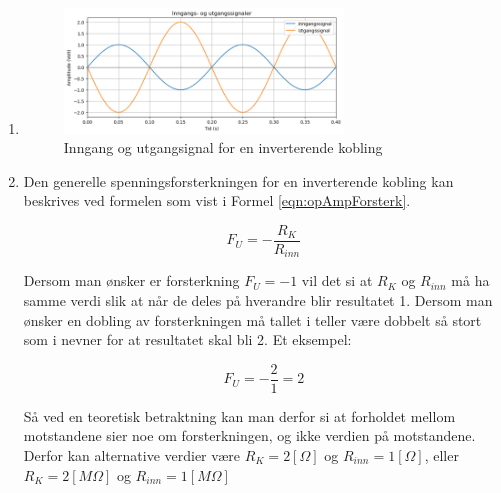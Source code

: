 \vspace{0.5cm} %

\begin{solution}[name=Løsningsforslag oppgave]
		\begin{enumerate}[label=\roman*)]
	\item
		\begin{figure}[H]
		\centering
		\includegraphics[width=0.7\textwidth]{operasjonsforsterker/plot/InvPlotSOL.png}
		\caption{Inngang og utgangsignal for en inverterende kobling}
		\label{fig:invPlotSOL}
	\end{figure}
	\item Den generelle spenningsforsterkningen for en inverterende kobling kan beskrives ved formelen som vist i Formel \ref{eqn:opAmpForsterk}.

	\begin{equation}
		\label{eqn:opAmpForsterk}
		F_U = -\frac{R_K}{R_{inn}}
	\end{equation}

Dersom man ønsker er forsterkning $F_U=-1$ vil det si at $R_K$ og $R_{inn}$ må ha samme verdi slik at når de deles på hverandre blir resultatet 1. Dersom man ønsker en dobling av forsterkningen må tallet i teller være dobbelt så stort som i nevner for at resultatet skal bli 2. Et eksempel:

\[F_U=-\frac{2}{1}=2\]

Så ved en teoretisk betraktning kan man derfor si at forholdet mellom motstandene sier noe om forsterkningen, og ikke verdien på motstandene. Derfor kan alternative verdier være $R_K=2 [\Omega]$ og $R_{inn}=1[\Omega]$, eller $R_K=2 [M\Omega]$ og $R_{inn}=1[M\Omega]$

\end{enumerate}
\end{solution}
\vspace{0.5cm} %


